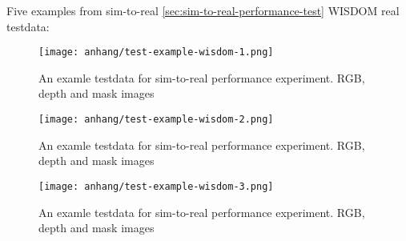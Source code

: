 	
	\FloatBarrier
	\clearpage
	Five examples from sim-to-real \ref{sec:sim-to-real-performance-test} WISDOM real testdata:
	\begin{figure}[H]
		\centering
		\texttt{[image: anhang/test-example-wisdom-1.png]}
		\caption[An examle testdata for sim-to-real performance experiment. RGB, depth and mask images]{An examle testdata for sim-to-real performance experiment. RGB, depth and mask images}
	\end{figure}
	\begin{figure}[H]
		\centering
		\texttt{[image: anhang/test-example-wisdom-2.png]}
		\caption[An examle testdata for sim-to-real performance experiment. RGB, depth and mask images]{An examle testdata for sim-to-real performance experiment. RGB, depth and mask images}
	\end{figure}
	\begin{figure}[H]
		\centering
		\texttt{[image: anhang/test-example-wisdom-3.png]}
		\caption[An examle testdata for sim-to-real performance experiment. RGB, depth and mask images]{An examle testdata for sim-to-real performance experiment. RGB, depth and mask images}
	\end{figure}
